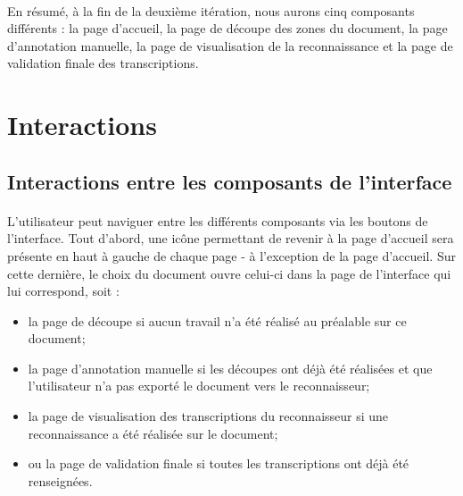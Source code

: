 
\paragraph{}
En résumé, à la fin de la deuxième itération, nous aurons cinq composants différents : la page d’accueil, la page de découpe des zones du document, la page d’annotation manuelle, la page de visualisation de la reconnaissance et la page de validation finale des transcriptions.


\section{Interactions}

\subsection{Interactions entre les composants de l'interface}

\paragraph{}
L’utilisateur peut naviguer entre les différents composants via les boutons de l’interface.
Tout d’abord, une icône permettant de revenir à la page d’accueil sera présente en haut à gauche de chaque page - à l’exception de la page d’accueil. Sur cette dernière, le choix du document ouvre celui-ci dans la page de l’interface qui lui correspond, soit :

\begin{itemize}[noitemsep]
\item la page de découpe si aucun travail n’a été réalisé au préalable sur ce document;
\item la page d’annotation manuelle si les découpes ont déjà été réalisées et que l’utilisateur n’a pas exporté le document vers le reconnaisseur;
\item la page de visualisation des transcriptions du reconnaisseur si une reconnaissance a été réalisée sur le document;
\item ou la page de validation finale si toutes les transcriptions ont déjà été renseignées.
\end{itemize}

